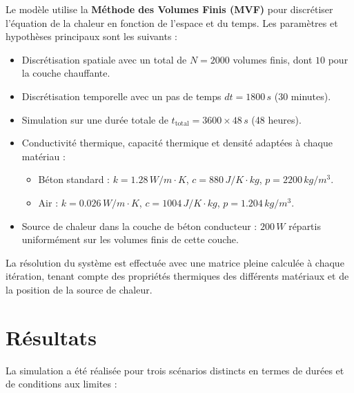 \documentclass[a4paper,11pt]{article}
\begin{document}
Le modèle utilise la \textbf{Méthode des Volumes Finis (MVF)} pour discrétiser l'équation de la chaleur en fonction de l'espace et du temps. Les paramètres et hypothèses principaux sont les suivants :
\begin{itemize}
    \item Discrétisation spatiale avec un total de \(N = 2000\) volumes finis, dont \(10\) pour la couche chauffante.
    \item Discrétisation temporelle avec un pas de temps \(dt = 1800 \, s\) (30 minutes).
    \item Simulation sur une durée totale de \(t_{\text{total}} = 3600 \times 48 \, s\) (48 heures).
    \item Conductivité thermique, capacité thermique et densité adaptées à chaque matériau :
    \begin{itemize}
        \item Béton standard : \(k = 1.28 \, W/m \cdot K\), \(c = 880 \, J/K \cdot kg\), \(p = 2200 \, kg/m^3\).
        \item Air : \(k = 0.026 \, W/m \cdot K\), \(c = 1004 \, J/K \cdot kg\), \(p = 1.204 \, kg/m^3\).
    \end{itemize}
    \item Source de chaleur dans la couche de béton conducteur : \(200 \, W\) répartis uniformément sur les volumes finis de cette couche.
\end{itemize}

La résolution du système est effectuée avec une matrice pleine calculée à chaque itération, tenant compte des propriétés thermiques des différents matériaux et de la position de la source de chaleur.


\section{Résultats}

La simulation a été réalisée pour trois scénarios distincts en termes de durées et de conditions aux limites :
\end{document}
